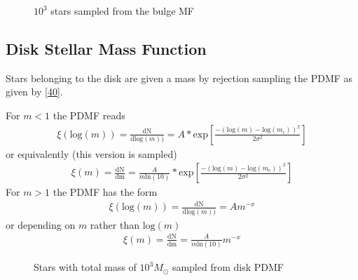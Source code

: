 \documentclass[letterpaper,10pt,english]{sphinxmanual}
\begin{document}
				\begin{figure}[htbp]
				\centering
				\capstart
				
				\noindent{}
				\caption{\(10^3\) stars sampled from the bulge MF}\label{\detokenize{NBodySimulation/Initialization:id43}}\label{\detokenize{NBodySimulation/Initialization:fig-initial-conditions-mass-bulge}}\end{figure}
			
			
			\subsection{Disk Stellar Mass Function}
				\label{\detokenize{NBodySimulation/Initialization:disk-stellar-mass-function}}
				\sphinxAtStartPar
				Stars belonging to the disk are given a mass by rejection sampling the PDMF as given by {[}\hyperlink{cite.NBodySimulation/Appendix:id2}{40}{]}.
				
				\sphinxAtStartPar
				For \(m<1\) the PDMF reads
				\begin{equation}\label{equation:NBodySimulation/Initialization:lognormal}
				\begin{split}\xi\left(\mathrm{log}(m)\right) = \frac{\mathrm{dN}}{\mathrm{dlog}(m))} = A*\mathrm{exp}[ \frac{-( \mathrm{log}(m) -\mathrm{log}( m_{c} ))^{2} }{2 \sigma^{2}}]\end{split}
				\end{equation}
				\sphinxAtStartPar
				or equivalently (this version is sampled)
				\begin{equation*}
				\begin{split}\xi\left(m\right) = \frac{\mathrm{dN}}{\mathrm{dm}} = \frac{A}{m\mathrm{ln}(10)}*\mathrm{exp}[ \frac{-( \mathrm{log}(m) -\mathrm{log}( m_{c} ))^{2} }{2 \sigma^{2}}]\end{split}
				\end{equation*}
				\sphinxAtStartPar
				For \(m>1\) the PDMF has the form
				\begin{equation*}
				\begin{split}\xi\left(\mathrm{log}(m)\right) = \frac{\mathrm{dN}}{\mathrm{dlog}(m))} = A m^{-x}\end{split}
				\end{equation*}
				\sphinxAtStartPar
				or depending on \(m\) rather than \(\mathrm{log}(m)\)
				\begin{equation*}
				\begin{split}\xi\left(m\right) = \frac{\mathrm{dN}}{\mathrm{dm}} = \frac{A}{m\mathrm{ln}(10)} m^{-x}\end{split}
				\end{equation*}
				\begin{figure}[htbp]
				\centering
				\capstart
				
				\noindent{}
				\caption{Stars with total mass of \(10^3 M_{\odot}\) sampled from disk PDMF}\label{\detokenize{NBodySimulation/Initialization:id44}}\label{\detokenize{NBodySimulation/Initialization:fig-initial-conditions-mass-disk}}\end{figure}
			
\end{document}

